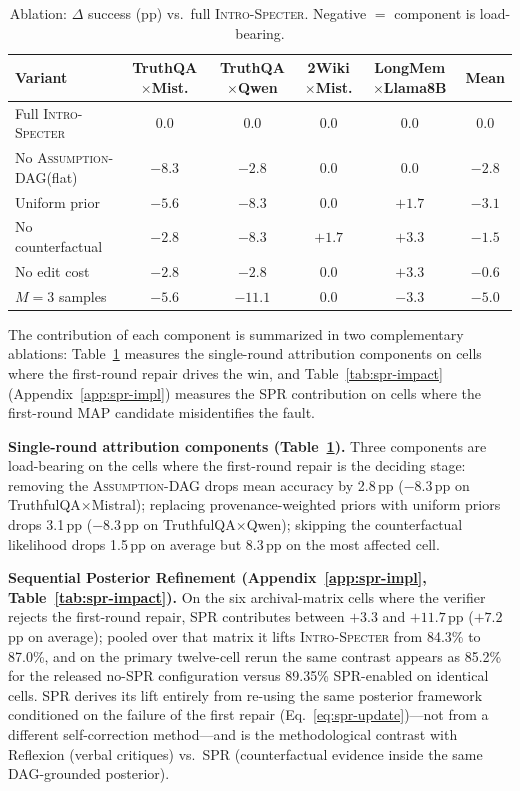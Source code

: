 \documentclass{article}
\newcommand{\method}{\textsc{Intro-Specter}\xspace}
\newcommand{\dagg}{\textsc{Assumption-DAG}\xspace}
\begin{document}
\begin{table}[t]\centering\small
\caption{Ablation: $\Delta$ success (pp) vs.\ full \method. Negative $=$ component is load-bearing.}
\label{tab:ablations}\setlength{\tabcolsep}{3pt}
\begin{tabular}{lcccc c}\toprule
Variant & \makecell{TruthQA\\$\times$Mist.} & \makecell{TruthQA\\$\times$Qwen} & \makecell{2Wiki\\$\times$Mist.} & \makecell{LongMem\\$\times$Llama8B} & Mean \\\midrule
Full \method     & 0.0 & 0.0 & 0.0 & 0.0 & 0.0 \\
No \dagg (flat)  & $-8.3$ & $-2.8$ & $0.0$ & $0.0$ & $-2.8$ \\
Uniform prior    & $-5.6$ & $-8.3$ & $0.0$ & $+1.7$ & $-3.1$ \\
No counterfactual & $-2.8$ & $-8.3$ & $+1.7$ & $+3.3$ & $-1.5$ \\
No edit cost     & $-2.8$ & $-2.8$ & $0.0$ & $+3.3$ & $-0.6$ \\
$M{=}3$ samples  & $-5.6$ & $-11.1$ & $0.0$ & $-3.3$ & $-5.0$ \\
\bottomrule\end{tabular}\end{table}

The contribution of each component is summarized in two complementary ablations: Table~\ref{tab:ablations} measures the single-round attribution components on cells where the first-round repair drives the win, and Table~\ref{tab:spr-impact} (Appendix~\ref{app:spr-impl}) measures the SPR contribution on cells where the first-round MAP candidate misidentifies the fault.

\textbf{Single-round attribution components (Table~\ref{tab:ablations}).} Three components are load-bearing on the cells where the first-round repair is the deciding stage: removing the \dagg drops mean accuracy by 2.8\,pp ($-8.3$\,pp on TruthfulQA$\times$Mistral); replacing provenance-weighted priors with uniform priors drops 3.1\,pp ($-8.3$\,pp on TruthfulQA$\times$Qwen); skipping the counterfactual likelihood drops 1.5\,pp on average but 8.3\,pp on the most affected cell.

\textbf{Sequential Posterior Refinement (Appendix~\ref{app:spr-impl}, Table~\ref{tab:spr-impact}).} On the six archival-matrix cells where the verifier rejects the first-round repair, SPR contributes between $+3.3$ and $+11.7$\,pp ($+7.2$\,pp on average); pooled over that matrix it lifts \method from 84.3\% to 87.0\%, and on the primary twelve-cell rerun the same contrast appears as 85.2\% for the released no-SPR configuration versus 89.35\% SPR-enabled on identical cells. SPR derives its lift entirely from re-using the same posterior framework conditioned on the failure of the first repair (Eq.~\ref{eq:spr-update})---not from a different self-correction method---and is the methodological contrast with Reflexion (verbal critiques) vs.\ SPR (counterfactual evidence inside the same DAG-grounded posterior).
\end{document}
